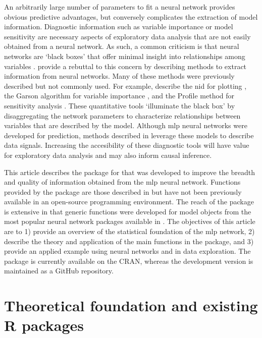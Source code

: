 \documentclass[article,shortnames]{jss}
\begin{document}
An arbitrarily large number of parameters to fit a neural network provides obvious predictive advantages, but conversely complicates the extraction of model information.  Diagnostic information such as variable importance or model sensitivity are necessary aspects of exploratory data analysis that are not easily obtained from a neural network. As such, a common criticism is that neural networks are `black boxes' that offer minimal insight into relationships among variables \citep[e.g.,][]{Paruelo97}.  \citet{Olden02} provide a rebuttal to this concern by describing methods to extract information from neural networks.  Many of these methods were previously described but not commonly used.  For example, \citet{Olden02} describe  the \ac{nid} for plotting \citep{Ozesmi99}, the Garson algorithm for variable importance \citep{Garson91}, and the Profile method for sensitivity analysis \citep{Lek96}.  These quantitative tools `illuminate the black box' by disaggregating the network parameters to characterize relationships between variables that are described by the model.  Although \ac{mlp} neural networks were developed for prediction, methods described in \citet{Olden02} leverage these models to describe data signals.  Increasing the accesibility of these diagnostic tools will have value for exploratory data analysis and may also inform causal inference.

This article describes the  package for  that was developed to improve the breadth and quality of information obtained from the \ac{mlp} neural network.  Functions provided by the package are those described in \citet{Olden02} but have not been previously available in an open-source programming environment.  The reach of the package is extensive in that generic functions were developed for model objects from the most popular neural network packages available in .  The objectives of this article are to 1) provide an overview of the statistical foundation of the \ac{mlp} network, 2) describe the theory and application of the main functions in the  package, and 3) provide an applied example using neural networks and  in data exploration.  The package is currently available on the \ac{CRAN}, whereas the development version is maintained as a GitHub repository.  

\section[Theoretical foundation]{Theoretical foundation and existing R packages}
\end{document}
